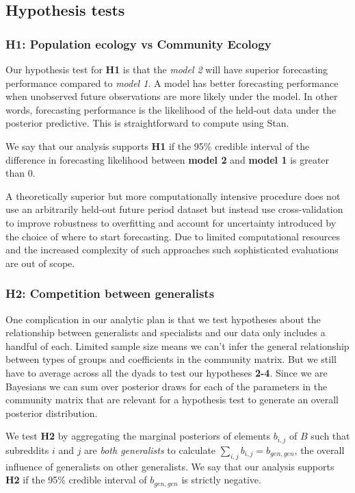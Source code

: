 \documentclass[12pt]{memoir}
\begin{document}
\subsection{Hypothesis tests}
\label{sec:hypothesis_tests}

\subsubsection{\textbf{H1:} Population ecology vs Community Ecology}

Our hypothesis test for \textbf{H1} is that the \emph{model 2} will have superior forecasting performance compared to \emph{model 1}.  A model has better forecasting performance when unobserved future observations are more likely under the model. In other words, forecasting performance is the likelihood of the held-out data under the posterior predictive.  This is straightforward to compute using Stan.

We say that our analysis supports \textbf{H1} if the 95\% credible interval of the difference in forecasting likelihood between \textbf{model 2} and \textbf{model 1} is greater than 0.

A theoretically superior but more computationally intensive procedure does not use an arbitrarily held-out future period dataset but instead use cross-validation to improve robustness to overfitting and account for uncertainty introduced by the choice of where to start forecasting. Due to limited computational resources and the increased complexity of such approaches such sophisticated evaluations are out of scope.

\subsubsection{\textbf{H2:} Competition between generalists}

One complication in our analytic plan is that we test hypotheses about the relationship between generalists and specialists and our data only includes a handful of each.  Limited sample size means we can't infer the general relationship between types of groups and coefficients in the community matrix.  But we still have to average across all the dyads to test our hypotheses \textbf{2-4}. Since we are Bayesians we can sum over posterior draws for each of the parameters in the community matrix that are relevant for a hypothesis test to generate an overall posterior distribution.


We test \textbf{H2} by aggregating the marginal posteriors of elements $b_{i,j}$ of $B$ such that subreddits $i$ and $j$ are \emph{both generalists} to calculate $\sum_{i,j}{b_{i,j}}=b_{gen,gen}$, the overall influence of generalists on other generalists. We say that our analysis supports \textbf{H2} if the 95\% credible interval of $b_{gen,gen}$ is strictly negative.
\end{document}

